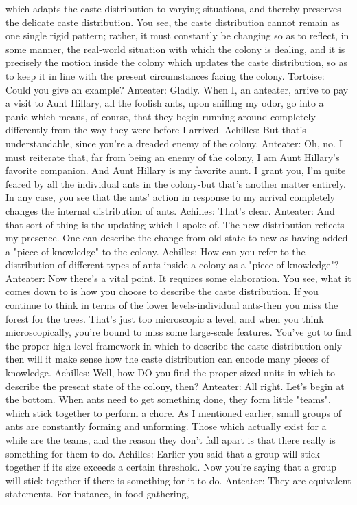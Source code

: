     which adapts the caste distribution to varying situations, and thereby preserves the
    delicate caste distribution. You see, the caste distribution cannot remain as one single
    rigid pattern; rather, it must constantly be changing so as to reflect, in some manner,
    the real-world situation with which the colony is dealing, and it is precisely the
    motion inside the colony which updates the caste distribution, so as to keep it in line
    with the present circumstances facing the colony.
Tortoise: Could you give an example?
Anteater: Gladly. When I, an anteater, arrive to pay a visit to Aunt Hillary, all the foolish
    ants, upon sniffing my odor, go into a panic-which means, of course, that they begin
    running around completely differently from the way they were before I arrived.
Achilles: But that's understandable, since you're a dreaded enemy of the colony.
Anteater: Oh, no. I must reiterate that, far from being an enemy of the colony, I am Aunt
    Hillary's favorite companion. And Aunt Hillary is my favorite aunt. I grant you, I'm
    quite feared by all the individual ants in the colony-but that's another matter entirely.
    In any case, you see that the ants' action in response to my arrival completely changes
    the internal distribution of ants.
Achilles: That's clear.
Anteater: And that sort of thing is the updating which I spoke of. The new distribution
    reflects my presence. One can describe the change from old state to new as having
    added a "piece of knowledge" to the colony.
Achilles: How can you refer to the distribution of different types of ants inside a colony
    as a "piece of knowledge"?
Anteater: Now there's a vital point. It requires some elaboration. You see, what it comes
    down to is how you choose to describe the caste distribution. If you continue to think
    in terms of the lower levels-individual ants-then you miss the forest for the trees.
    That's just too microscopic a level, and when you think microscopically, you're
    bound to miss some large-scale features. You've got to find the proper high-level
    framework in which to describe the caste distribution-only then will it make sense
    how the caste distribution can encode many pieces of knowledge.
Achilles: Well, how DO you find the proper-sized units in which to describe the present
    state of the colony, then?
Anteater: All right. Let's begin at the bottom. When ants need to get something done,
    they form little "teams", which stick together to perform a chore. As I mentioned
    earlier, small groups of ants are constantly forming and unforming. Those which
    actually exist for a while are the teams, and the reason they don't fall apart is that
    there really is something for them to do.
Achilles: Earlier you said that a group will stick together if its size exceeds a certain
    threshold. Now you're saying that a group will stick together if there is something for
    it to do.
Anteater: They are equivalent statements. For instance, in food-gathering,




